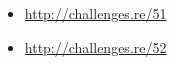\sectionold{\Exercises}

\begin{itemize}
	\item \url{http://challenges.re/51}
	\item \url{http://challenges.re/52}
\end{itemize}

